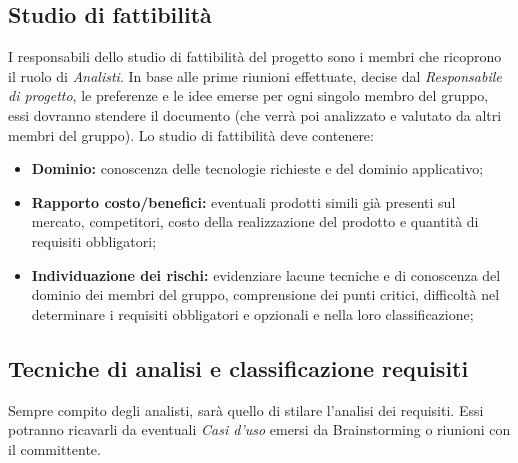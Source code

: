 \documentclass[a4paper]{report}
\begin{document}
	\subsection{Studio di fattibilità}
	I responsabili dello studio di fattibilità del progetto sono i membri che ricoprono il ruolo di \emph{Analisti}. In base alle prime
	riunioni effettuate, decise dal \emph{Responsabile di progetto}, le preferenze e le idee emerse per ogni singolo 
	membro del gruppo, essi dovranno stendere il documento (che verrà poi analizzato e valutato da altri membri del gruppo). Lo studio 
	di fattibilità deve contenere:
	\begin{itemize}
		\item \textbf{Dominio:} conoscenza delle tecnologie richieste e del dominio applicativo;
		\item \textbf{Rapporto costo/benefici:} eventuali prodotti simili già presenti sul mercato, competitori, costo della 
		realizzazione del prodotto e quantità di requisiti obbligatori;
		\item \textbf{Individuazione dei rischi:} evidenziare lacune tecniche e di conoscenza del dominio dei membri del gruppo, comprensione
		dei punti critici, difficoltà nel determinare i requisiti obbligatori e opzionali e nella loro classificazione; 
	\end{itemize}				 
	\subsection{Tecniche di analisi e classificazione requisiti}
	Sempre compito degli analisti, sarà quello di stilare l'analisi dei requisiti. Essi potranno ricavarli da eventuali \emph{Casi 
		d'uso} emersi da Brainstorming o riunioni con il committente.
	
\end{document}
